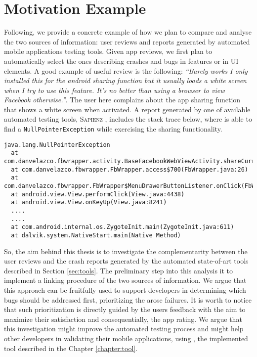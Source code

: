\section{Motivation Example}
Following, we provide a concrete example of how we plan to compare and analyse the two sources of information: user reviews and reports generated by automated mobile applications testing tools. Given app reviews, we first plan to automatically select the ones describing crashes and bugs in features or in UI elements.
A good example of useful review is the following: 
\smallbreak
\emph{\small``Barely works I only installed this for the android sharing function but it usually loads a white screen when I try to use this feature. It's no better than using a browser to view Facebook otherwise.''}. 
\smallbreak
The user here complains about the app sharing function that shows a white screen when activated. A report generated by one of available automated testing tools, \textsc{Sapienz} \cite{sapienz}, includes the stack trace below, where \sapienz is able to find a \texttt{NullPointerException} while exercising the sharing functionality. 
\smallbreak
\begin{lstlisting}[basicstyle=\fontsize{5.5}{8}\ttfamily]
java.lang.NullPointerException
  at com.danvelazco.fbwrapper.activity.BaseFacebookWebViewActivity.shareCurrentPage(BaseFacebookWebViewActivity.java:418)
  at com.danvelazco.fbwrapper.FbWrapper.access$700(FbWrapper.java:26)
  at com.danvelazco.fbwrapper.FbWrapper$MenuDrawerButtonListener.onClick(FbWrapper.java:376)
  at android.view.View.performClick(View.java:4438)
  at android.view.View.onKeyUp(View.java:8241)
  ....
  ....
  at com.android.internal.os.ZygoteInit.main(ZygoteInit.java:611)
  at dalvik.system.NativeStart.main(Native Method)
\end{lstlisting}
\smallbreak
So, the aim behind this thesis is to investigate the complementarity between the user reviews and the crash reports generated by the automated state-of-art tools described in Section \ref{sec:tools}.
The preliminary step into this analysis it to implement a linking procedure of the two sources of information. We argue that this approach can be fruitfully used to support developers in determining which bugs should be addressed first, prioritizing the arose failures. It is worth to notice that such prioritization is directly guided by the users feedback with the aim to maximize their satisfaction and consequentially, the app rating.
We argue that this investigation might improve the automated testing process and might help other developers in validating their mobile applications, using \toolname, the implemented tool described in the Chapter \ref{chapter:tool}.

